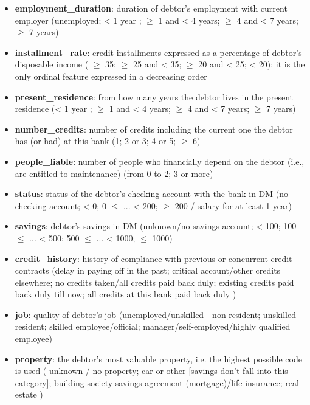 \documentclass[letterpaper]{article}
\begin{document}
	\begin{itemize}
		\item \textbf{employment\_duration}:  duration of debtor’s employment with current employer (unemployed; < 1 year ; $\geq$ 1 and < 4 years; $\geq$ 4 and < 7 years; $\geq$ 7 years)
		\item \textbf{installment\_rate}: credit installments expressed as a percentage of debtor’s disposable income ( $\geq$ 35; $\geq$ 25 and < 35; $\geq$ 20 and < 25; < 20); it is the only ordinal feature expressed in a decreasing order
		\item \textbf{present\_residence}: from how many years the debtor lives in the present residence (< 1 year ; $\geq$ 1 and < 4 years; $\geq$ 4 and < 7 years; $\geq$ 7 years)
		\item \textbf{number\_credits}:  number of credits including the current one the debtor has (or had) at this bank (1; 2 or 3; 4 or 5; $\geq$ 6)
		\item \textbf{people\_liable}: number of people who financially depend on the debtor (i.e., are entitled to maintenance) (from 0 to 2; 3 or more)
		\item \textbf{status\footnotemark}: status of the debtor’s checking account with the bank in DM (no checking account; < 0; 0 $\leq$ ... < 200; $\geq$ 200 / salary for at least 1 year)
		\item \textbf{savings\footnotemark[\value{footnote}]}: debtor’s savings in DM (unknown/no savings account; <  100; 100 $\leq$ ... <  500; 500 $\leq$ ... < 1000; $\leq$ 1000)
		\item \textbf{credit\_history\footnotemark[\value{footnote}]}:  history of compliance with previous or concurrent credit contracts (delay in paying off in the past; critical account/other credits elsewhere; no credits taken/all credits paid back duly; existing credits paid back duly till now; all credits at this bank paid back duly )
		\item \textbf{job}: quality of debtor’s job (unemployed/unskilled - non-resident; unskilled - resident; skilled employee/official; manager/self-employed/highly qualified employee)
		\item \textbf{property}:  the debtor’s most valuable property, i.e. the highest possible code is used ( unknown / no property; car or other [savings don't fall into this category]; building society savings agreement (mortgage)/life insurance; real estate )
	\end{itemize}
\end{document}
